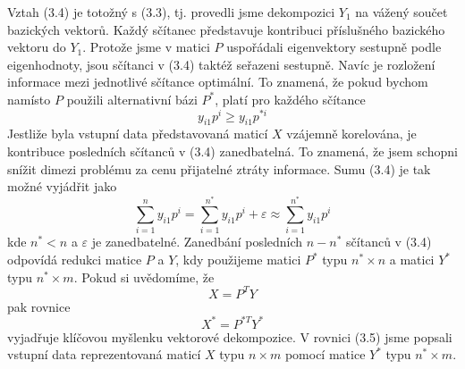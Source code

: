\documentclass[a4paper]{book}
\begin{document}
Vztah (3.4) je totožný s (3.3), tj. provedli jsme dekompozici $Y_1$ na vážený součet bazických vektorů. Každý sčítanec představuje kontribuci příslušného bazického vektoru do $Y_1$. Protože jsme v matici $P$ uspořádali eigenvektory sestupně podle eigenhodnoty, jsou sčítanci v (3.4) taktéž seřazeni sestupně. Navíc je rozložení informace mezi jednotlivé sčítance optimální. To znamená, že pokud bychom namísto $P$ použili alternativní bázi $P^*$, platí pro každého sčítance
\begin{equation*}
y_{i1}p^i \ge y_{i1}p^{*i}
\end{equation*} 
Jestliže byla vstupní data představovaná maticí $X$ vzájemně korelována, je kontribuce posledních sčítanců v (3.4) zanedbatelná. To znamená, že jsem schopni snížit dimezi problému za cenu přijatelné ztráty informace. Sumu (3.4) je tak možné vyjádřit jako
\begin{equation*}
\sum_{i = 1}^n y_{i1} p^i = \sum_{i = 1}^{n^*} y_{i1} p^i + \varepsilon \approx \sum_{i = 1}^{n^*} y_{i1} p^i
\end{equation*}
kde $n^* < n$ a $\varepsilon$ je zanedbatelné. Zanedbání posledních $n-n^*$ sčítanců v (3.4) odpovídá redukci matice $P$ a $Y$, kdy použijeme matici $P^*$ typu $n^* \times n$ a matici $Y^*$ typu $n^* \times m$. Pokud si uvědomíme, že
\begin{equation*}
X = P^T Y
\end{equation*}
pak rovnice
\begin{equation}
X^* = P^{*T} Y^*
\end{equation}
vyjadřuje klíčovou myšlenku vektorové dekompozice. V rovnici (3.5) jsme popsali vstupní data reprezentovaná maticí $X$ typu $n \times m$ pomocí matice $Y^*$ typu $n^* \times m$.
\end{document}
